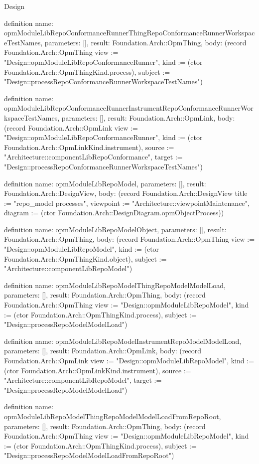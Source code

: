\begin{lexlean}{Design}
\begin{semanticmodule}
definition{
  name: opmModuleLibRepoConformanceRunnerThingRepoConformanceRunnerWorkspaceTestNames,
  parameters: [],
  result: Foundation.Arch::OpmThing,
  body: (record Foundation.Arch::OpmThing {view := "Design::opmModuleLibRepoConformanceRunner", kind := (ctor Foundation.Arch::OpmThingKind.process), subject := "Design::processRepoConformanceRunnerWorkspaceTestNames"})
}

definition{
  name: opmModuleLibRepoConformanceRunnerInstrumentRepoConformanceRunnerWorkspaceTestNames,
  parameters: [],
  result: Foundation.Arch::OpmLink,
  body: (record Foundation.Arch::OpmLink {view := "Design::opmModuleLibRepoConformanceRunner", kind := (ctor Foundation.Arch::OpmLinkKind.instrument), source := "Architecture::componentLibRepoConformance", target := "Design::processRepoConformanceRunnerWorkspaceTestNames"})
}

definition{
  name: opmModuleLibRepoModel,
  parameters: [],
  result: Foundation.Arch::DesignView,
  body: (record Foundation.Arch::DesignView {title := "repo_model processes", viewpoint := "Architecture::viewpointMaintenance", diagram := (ctor Foundation.Arch::DesignDiagram.opmObjectProcess)})
}

definition{
  name: opmModuleLibRepoModelObject,
  parameters: [],
  result: Foundation.Arch::OpmThing,
  body: (record Foundation.Arch::OpmThing {view := "Design::opmModuleLibRepoModel", kind := (ctor Foundation.Arch::OpmThingKind.object), subject := "Architecture::componentLibRepoModel"})
}

definition{
  name: opmModuleLibRepoModelThingRepoModelModelLoad,
  parameters: [],
  result: Foundation.Arch::OpmThing,
  body: (record Foundation.Arch::OpmThing {view := "Design::opmModuleLibRepoModel", kind := (ctor Foundation.Arch::OpmThingKind.process), subject := "Design::processRepoModelModelLoad"})
}

definition{
  name: opmModuleLibRepoModelInstrumentRepoModelModelLoad,
  parameters: [],
  result: Foundation.Arch::OpmLink,
  body: (record Foundation.Arch::OpmLink {view := "Design::opmModuleLibRepoModel", kind := (ctor Foundation.Arch::OpmLinkKind.instrument), source := "Architecture::componentLibRepoModel", target := "Design::processRepoModelModelLoad"})
}

definition{
  name: opmModuleLibRepoModelThingRepoModelModelLoadFromRepoRoot,
  parameters: [],
  result: Foundation.Arch::OpmThing,
  body: (record Foundation.Arch::OpmThing {view := "Design::opmModuleLibRepoModel", kind := (ctor Foundation.Arch::OpmThingKind.process), subject := "Design::processRepoModelModelLoadFromRepoRoot"})
}


\end{semanticmodule}
\end{lexlean}
